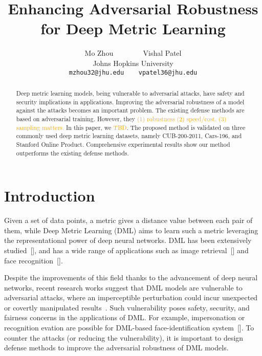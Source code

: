 \documentclass[10pt,twocolumn,letterpaper]{article}
\newcommand{\oo}[1]{\textcolor{orange}{#1}}
\begin{document}
\title{Enhancing Adversarial Robustness for Deep Metric Learning}

\author{Mo Zhou ~~~~~~~ Vishal Patel\\
Johns Hopkins University\\
{\tt\small mzhou32@jhu.edu ~~ vpatel36@jhu.edu}
}
\maketitle

\begin{abstract}
	Deep metric learning models, being vulnerable to adversarial
	attacks, have safety and security implications in applications.
	Improving the adversarial robustness of a model against the attacks becomes
	an important problem.
	The existing defense methods are based on adversarial training.
	However, they \oo{(1) robustness (2) speed/cost. (3) sampling matters.}
	In this paper, we \oo{TBD}.
	The proposed method is validated on three commonly
	used deep metric learning datasets, namely CUB-200-2011, Cars-196,
	and Stanford Online Product.
	Comprehensive experimental results show our method outperforms
	the existing defense methods.
\end{abstract}

\section{Introduction}
\label{sec:1}


Given a set of data points, a metric gives a distance value between each pair
of them, while Deep Metric Learning (DML) aims to learn such a metric
leveraging the representational power of deep neural networks.
%
DML has been extensively studied~[], and has a wide range of applications
such as image retrieval~[] and face recognition~[].


Despite the improvements of this field thanks to the advancement of deep neural
networks, recent research works suggest that DML models are vulnerable to
adversarial attacks, where an imperceptible perturbation could incur unexpected
or covertly manipulated results~\cite{advrank}.
%
Such vulnerability poses safety, security, and fairness concerns in the
applications of DML.
%
For example, impersonation or recognition evation are possible for DML-based
face-identification system~[].
%
To counter the attacks (or reducing the vulnerability), it is important to
design defense methods to improve the adversarial robustness of DML models.
\end{document}
